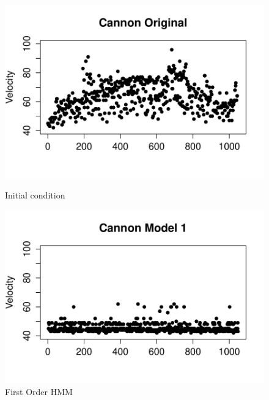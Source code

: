 \documentclass{article} %
\begin{document}
\begin{figure}[ht] 
  \label{ fig7} 
  \begin{minipage}[b]{0.5\linewidth}
    \centering
    \includegraphics[scale = 0.45]{CannonOriginalVelocity.pdf} 
    \caption{Initial condition\label{PV0}} 
    \vspace{4ex}
  \end{minipage}%
  \begin{minipage}[b]{0.5\linewidth}
    \centering
    \includegraphics[scale = 0.45]{CannonModel1Velocity.pdf} 
    \caption{First Order HMM\label{PV1} }
    \vspace{4ex}
  \end{minipage} 
  \begin{minipage}[b]{0.5\linewidth}
    \centering

\end{minipage}
\end{figure}
\end{document}
